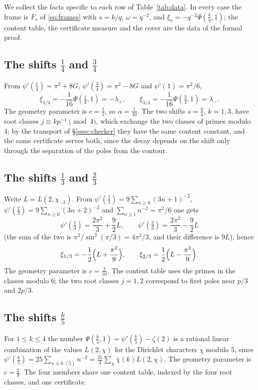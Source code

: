 \documentclass[11pt]{amsart}
\theoremstyle{definition}
\theoremstyle{remark}
\numberwithin{equation}{section}
\begin{document}
We collect the facts specific to each row of Table~\ref{tab:data}. In every case the frame is $F_s$ of \eqref{eq:frames} with
$s=k/q$, $\omega=q^{-2}$, and $\xi_s=-q^{-2}\Psi(\frac kq,1)$; the content table, the certificate measure and the cover are
the data of the formal proof.

\subsection{The shifts $\frac14$ and $\frac34$}
From $\psi'(\frac14)=\pi^2+8G$, $\psi'(\frac34)=\pi^2-8G$ and $\psi'(1)=\pi^2/6$,
\[
 \xi_{1/4}=-\frac1{16}\Psi(\tfrac14,1)=-\lambda_+,\qquad \xi_{3/4}=-\frac1{16}\Psi(\tfrac34,1)=\lambda_- .
\]
The geometry parameter is $c=\frac15$, so $\alpha=\frac1{10}$. The two shifts $s=\frac k4$, $k=1,3$, have root classes $j\equiv kp^{-1}\pmod4$,
which exchange the two classes of primes modulo $4$; by the transport of \S\ref{ssec:checker} they have the same content
constant, and the same certificate serves both, since the decay depends on the shift only through the separation of the
poles from the contour.

\subsection{The shifts $\frac13$ and $\frac23$}\label{sec:thirds}
Write $L=L(2,\chi_{-3})$. From $\psi'(\tfrac13)=9\sum_{n\ge0}(3n+1)^{-2}$, $\psi'(\tfrac23)=9\sum_{n\ge0}(3n+2)^{-2}$ and
$\sum_{n\ge1}n^{-2}=\pi^2/6$ one gets
\begin{equation}\label{eq:trigamma-thirds}
 \psi'(\tfrac13)=\frac{2\pi^2}3+\frac92L,\qquad \psi'(\tfrac23)=\frac{2\pi^2}3-\frac92L
\end{equation}
(the sum of the two is $\pi^2/\sin^2(\pi/3)=4\pi^2/3$, and their difference is $9L$), hence
\begin{equation}\label{eq:xi-thirds}
 \xi_{1/3}=-\frac12\Bigl(L+\frac{\pi^2}9\Bigr),\qquad \xi_{2/3}=\frac12\Bigl(L-\frac{\pi^2}9\Bigr).
\end{equation}
The geometry parameter is $c=\frac3{10}$. The content table uses the primes in the classes modulo $6$; the two root classes
$j=1,2$ correspond to first poles near $p/3$ and $2p/3$.

\subsection{The shifts $\frac k5$}\label{sec:fifths}
For $1\le k\le4$ the number $\Psi(\frac k5,1)=\psi'(\frac k5)-\zeta(2)$ is a rational linear combination of the values
$L(2,\chi)$ for the Dirichlet characters $\chi$ modulo $5$, since
$\psi'(\frac k5)=25\sum_{n\equiv k\ (5)}n^{-2}=\frac{25}4\sum_\chi\bar\chi(k)L(2,\chi)$. The geometry parameter is $c=\frac29$.
The four members share one content table, indexed by the four root classes, and one certificate.
\end{document}
